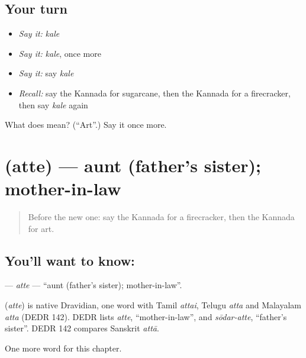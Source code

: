 \subsection*{Your turn}
\begin{itemize}
\raggedright
  \item \emph{Say it:} \emph{kale}
  \item \emph{Say it:} \emph{kale}, once more
  \item \emph{Say it:} say \emph{kale}
  \item \emph{Recall:} say the Kannada for sugarcane, then the Kannada for a firecracker, then say \emph{kale} again
\end{itemize}

\begin{tcolorbox}[breakable,colback=teal!4,colframe=teal!35!black,title={Before you move on}]
What does  mean? (\textquotedblleft{}Art\textquotedblright{}.) Say it once more.
\end{tcolorbox}
\section[\texorpdfstring{\kn{ಅತ್ತೆ} (atte)}{ಅತ್ತೆ (atte)}]{ (atte) — aunt (father's sister); mother-in-law}

\label{lesson:KA-C226-atte}



\begin{quote}
Before the new one: say the Kannada for a firecracker, then the Kannada for art.
\end{quote}

\subsection*{You'll want to know: }
\textbf{} — \emph{atte} — \textquotedblleft{}aunt (father's sister); mother-in-law\textquotedblright{}.

\begin{cousinweb}
\textbf{} (\emph{atte}) is native Dravidian, one word with Tamil \emph{attai}, Telugu \emph{atta} and Malayalam \emph{atta} (DEDR 142). DEDR lists \emph{atte}, \textquotedblleft{}mother-in-law\textquotedblright{}, and \emph{sōdar-atte}, \textquotedblleft{}father's sister\textquotedblright{}. DEDR 142 compares Sanskrit \emph{attā}.
\end{cousinweb}

\begin{grammarlens}[title={What you've built}]
One more word for this chapter.
\end{grammarlens}

